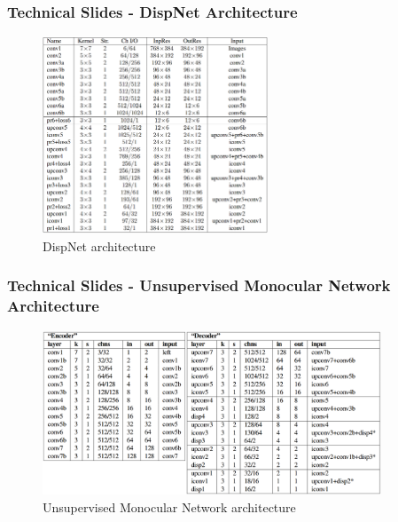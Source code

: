 \documentclass{beamer}
\begin{document}
\begin{frame}
\frametitle{Technical Slides - DispNet Architecture}
\begin{figure}
    \centering
        \includegraphics[width=0.6\textwidth]{dispnet_architecture.png}
        \caption{DispNet architecture}
\end{figure}
\end{frame}

\begin{frame}
\frametitle{Technical Slides - Unsupervised Monocular Network Architecture}
\begin{figure}
    \centering
        \includegraphics[width=0.9\textwidth]{monodepth_architecture.png}
        \caption{Unsupervised Monocular Network architecture}
\end{figure}
\end{frame}
\end{document}
